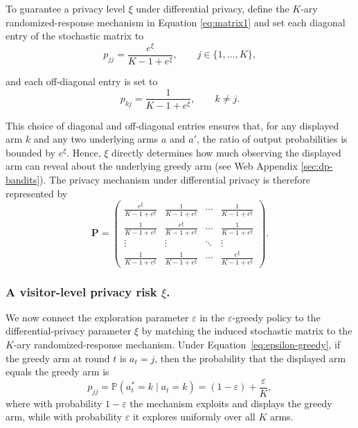 \documentclass[mksc,nonblindrev]{informs3}
\begin{document}
To guarantee a privacy level \(\xi\) under differential privacy, \cite{wang2016using} define the \(K\)-ary randomized-response mechanism in Equation \eqref{eq:matrix1} and set each diagonal entry of the stochastic matrix to\begin{equation}\label{eq:offdiag}
p_{jj}=\frac{e^{\xi}}{K-1+e^{\xi}},
\qquad j\in\{1,\dots,K\},
\end{equation}

\noindent and each off-diagonal entry is set to
\begin{equation}
p_{kj}=\frac{1}{K-1+e^{\xi}},
\qquad k\neq j.
\end{equation}

This choice of diagonal and off-diagonal entries ensures that, for any displayed arm \(k\) and any two underlying arms \(a\) and \(a'\), the ratio of output probabilities is bounded by \(e^\xi\). Hence, \(\xi\) directly determines how much observing the displayed arm can reveal about the underlying greedy arm (see Web Appendix \ref{sec:dp-bandits}). The privacy mechanism under differential privacy is therefore represented by
\begin{equation}\label{eq:matrix}
\mathbf P
=
\begin{pmatrix}
\frac{e^{\xi}}{K-1+e^{\xi}} & \frac{1}{K-1+e^{\xi}} & \cdots & \frac{1}{K-1+e^{\xi}}\\
\frac{1}{K-1+e^{\xi}} & \frac{e^{\xi}}{K-1+e^{\xi}} & \cdots & \frac{1}{K-1+e^{\xi}}\\
\vdots & \vdots & \ddots & \vdots\\
\frac{1}{K-1+e^{\xi}} & \frac{1}{K-1+e^{\xi}} & \cdots & \frac{e^{\xi}}{K-1+e^{\xi}}
\end{pmatrix}.
\end{equation}
\subsubsection{A visitor-level privacy risk \(\xi\).}
We now connect the exploration parameter \(\varepsilon\) in the \(\varepsilon\)-greedy policy to the differential-privacy parameter \(\xi\) by matching the induced stochastic matrix to the \(K\)-ary randomized-response mechanism. Under Equation~\eqref{eq:epsilon-greedy}, if the greedy arm at round \(t\) is \(a_t=j\), then the probability that the displayed arm equals the greedy arm is
\begin{equation}\label{eq:probabilittttt}
p_{jj}
=
\mathbb{P}(a_t^{*}=k \mid a_t=k)
=
(1-\varepsilon)+\frac{\varepsilon}{K},
\end{equation}
where with probability \(1-\varepsilon\) the mechanism exploits and displays the greedy arm, while with probability \(\varepsilon\) it explores uniformly over all \(K\) arms. 
\end{document}

